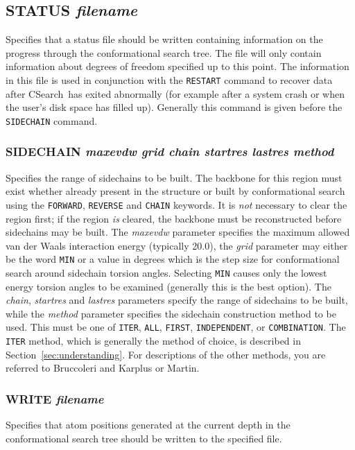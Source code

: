 \documentclass{report}
\newcommand{\cs}{CSearch}
\newcommand{\es}{\relax}
\begin{document}
\subsection{STATUS {\em filename}}
Specifies that a status file should be written containing information on
the progress through the conformational search tree. The file will only
contain information about degrees of freedom specified up to this point.
The information in this file is used in conjunction with the {\tt RESTART}
command to recover data after \cs\ has exited abnormally (for example after
a system crash or when the user's disk space has filled up). Generally this
command is given before the {\tt SIDECHAIN} command.

\subsubsection{SIDECHAIN {\em maxevdw grid chain startres lastres method}}
Specifies the range of sidechains to be built. The backbone for this region
must exist whether already present in the structure or built by conformational
search using the {\tt FORWARD}, {\tt REVERSE} and {\tt CHAIN} keywords. It
is {\em not\/} necessary to clear the region first; if the region {\em is\/}
cleared, the backbone must be reconstructed before sidechains may be built.
The {\em maxevdw\/}
parameter specifies the maximum allowed van der Waals interaction energy
(typically 20.0), the {\em grid\/} parameter may either be the word {\tt MIN} 
or a value in degrees which is the step size for conformational search around
sidechain torsion angles. Selecting {\tt MIN} causes only the lowest energy
torsion angles to be examined (generally this is the best option). 
The {\em chain}, {\em startres} and {\em lastres} parameters specify the 
range of sidechains to be built, while the {\em method} parameter specifies
the sidechain construction method to be used. This must be one of {\tt ITER},
{\tt ALL}, {\tt FIRST}, {\tt INDEPENDENT}, or {\tt COMBINATION}. The {\tt
ITER} method, which is generally the method of choice, is described in 
Section~\ref{sec:understanding}. For descriptions of the other methods,
you are referred to Bruccoleri and Karplus\cite{bruc:congen} or
Martin\cite{martin:thesis}.

\subsubsection{WRITE {\em filename}}
\es
Specifies that atom positions generated at the current depth in the 
conformational search tree should be written to the specified file.
\end{document}
